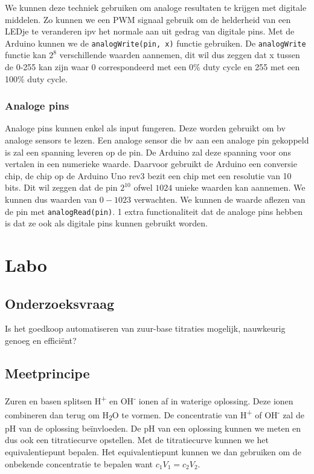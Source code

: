 \documentclass[10pt,twoside]{report}
\newcommand{\code}[1]{{\texttt{#1}}}
\newcommand{\pbr}{\hfill\break\hfill\break}
\begin{document}
We kunnen deze techniek gebruiken om analoge resultaten te krijgen met digitale middelen. Zo kunnen we een PWM signaal gebruik om de helderheid van een LEDje te veranderen ipv het normale aan uit gedrag van digitale pins.
\pbr
Met de Arduino kunnen we de \code{analogWrite(pin, x)} functie gebruiken. De \code{analogWrite} functie kan $2^8$ verschillende waarden aannemen, dit wil dus zeggen dat x tussen de 0-255 kan zijn waar 0 correspondeerd met een 0\% duty cycle en 255 met een 100\% duty cycle.

\subsection{Analoge pins}
Analoge pins kunnen enkel als input fungeren. Deze worden gebruikt om bv analoge sensors te lezen. Een analoge sensor die bv aan een analoge pin gekoppeld is zal een spanning leveren op de pin. De Arduino zal deze spanning voor ons vertalen in een numerieke waarde. Daarvoor gebruikt de Arduino een conversie chip, de chip op de Arduino Uno rev3 bezit een chip met een resolutie van 10 bits. Dit wil zeggen dat de pin $2^{10}$ ofwel $1024$ unieke waarden kan aannemen. We kunnen dus waarden van $0-1023$ verwachten. We kunnen de waarde aflezen van de pin met \code{analogRead(pin)}. 1 extra functionaliteit dat de analoge pins hebben is dat ze ook als digitale pins kunnen gebruikt worden.

\chapter{Labo}
\section{Onderzoeksvraag}
Is het goedkoop automatiseren van zuur-base titraties mogelijk, nauwkeurig genoeg en efficiënt?

\section{Meetprincipe}
Zuren en basen splitsen H\textsuperscript{+} en OH\textsuperscript{-} ionen af in waterige oplossing. Deze ionen combineren dan terug om H\textsubscript{2}O te vormen. De concentratie van H\textsuperscript{+} of OH\textsuperscript{-} zal de pH van de oplossing beïnvloeden. De pH van een oplossing kunnen we meten en dus ook een titratiecurve opstellen. Met de titratiecurve kunnen we het equivalentiepunt bepalen. Het equivalentiepunt kunnen we dan gebruiken om de onbekende concentratie te bepalen want $c_1V_1 = c_2V_2$.
\end{document}
